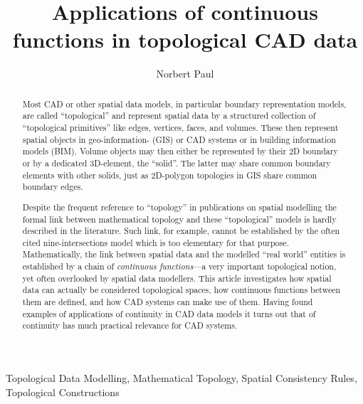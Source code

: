 \documentclass[5p]{elsarticle}
\newcommand{\qq}[1]{``#1''}
\begin{document}
\begin{frontmatter}    

\title{Applications of continuous functions in topological CAD data}



\author{Norbert Paul}
\address{Geodetic Institute of Karlsruhe (GIK), KIT, Englerstra{\ss}e 7, DE 76131 Karlsruhe\\
E-mail: norbert.paul@kit.edu}




\begin{abstract}
Most CAD or other spatial data models, in particular boundary representation models, are 
called \qq{topological} and represent spatial data by a structured collection of 
\qq{topological primitives} like edges, vertices, faces, and volumes. 
These then represent spatial objects in geo-information- (GIS) or CAD systems or in building 
information models (BIM). 
Volume objects may then either be represented by their 2D boundary or by a dedicated 
3D-element, the \qq{solid}. The latter may share common boundary elements with other 
solids, just as 2D-polygon topologies in GIS share common boundary edges. 

Despite the frequent reference to \qq{topology} in publications on spatial modelling the 
formal link between mathematical topology and these \qq{topological} models is hardly described 
in the literature. Such link, for example, cannot be established by 
the often cited nine-intersections model which is too elementary for that purpose. 
Mathematically, the link between spatial data and the modelled \qq{real world} entities 
is established by a chain of \emph{continuous functions}---a very important topological notion, 
yet often overlooked by spatial data modellers. 
This article investigates how spatial data can actually be considered topological spaces, 
how continuous functions between them are defined, and how CAD systems can make use of them. 
Having found examples of applications of continuity in CAD data models 
it turns out that of continuity has much practical relevance for CAD systems. 
\end{abstract} 

\begin{keyword}
Topological Data Modelling\sep 
Mathematical Topology\sep 
Spatial Consistency Rules\sep 
Topological Constructions
\end{keyword}

\end{frontmatter}    
\end{document}
